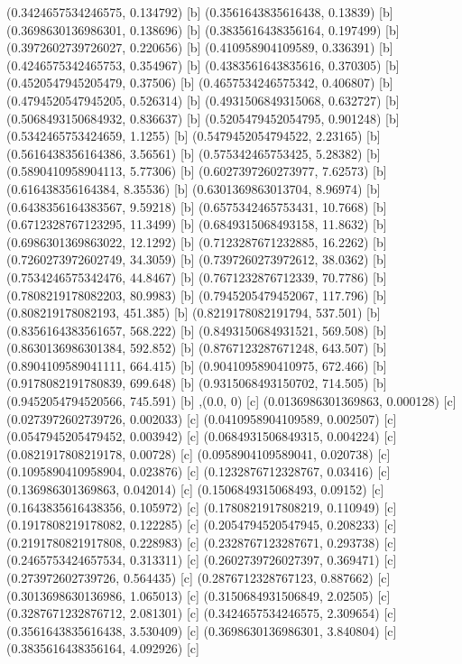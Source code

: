 {{{(0.3424657534246575, 0.134792) [b] 
(0.3561643835616438, 0.13839) [b] 
(0.3698630136986301, 0.138696) [b] 
(0.3835616438356164, 0.197499) [b] 
(0.3972602739726027, 0.220656) [b] 
(0.410958904109589, 0.336391) [b] 
(0.4246575342465753, 0.354967) [b] 
(0.4383561643835616, 0.370305) [b] 
(0.4520547945205479, 0.37506) [b] 
(0.4657534246575342, 0.406807) [b] 
(0.4794520547945205, 0.526314) [b] 
(0.4931506849315068, 0.632727) [b] 
(0.5068493150684932, 0.836637) [b] 
(0.5205479452054795, 0.901248) [b] 
(0.5342465753424659, 1.1255) [b] 
(0.5479452054794522, 2.23165) [b] 
(0.5616438356164386, 3.56561) [b] 
(0.575342465753425, 5.28382) [b] 
(0.5890410958904113, 5.77306) [b] 
(0.6027397260273977, 7.62573) [b] 
(0.616438356164384, 8.35536) [b] 
(0.6301369863013704, 8.96974) [b] 
(0.6438356164383567, 9.59218) [b] 
(0.6575342465753431, 10.7668) [b] 
(0.6712328767123295, 11.3499) [b] 
(0.6849315068493158, 11.8632) [b] 
(0.6986301369863022, 12.1292) [b] 
(0.7123287671232885, 16.2262) [b] 
(0.7260273972602749, 34.3059) [b] 
(0.7397260273972612, 38.0362) [b] 
(0.7534246575342476, 44.8467) [b] 
(0.7671232876712339, 70.7786) [b] 
(0.7808219178082203, 80.9983) [b] 
(0.7945205479452067, 117.796) [b] 
(0.808219178082193, 451.385) [b] 
(0.8219178082191794, 537.501) [b] 
(0.8356164383561657, 568.222) [b] 
(0.8493150684931521, 569.508) [b] 
(0.8630136986301384, 592.852) [b] 
(0.8767123287671248, 643.507) [b] 
(0.8904109589041111, 664.415) [b] 
(0.9041095890410975, 672.466) [b] 
(0.9178082191780839, 699.648) [b] 
(0.9315068493150702, 714.505) [b] 
(0.9452054794520566, 745.591) [b] 
},{(0.0, 0) [c] 
(0.0136986301369863, 0.000128) [c] 
(0.0273972602739726, 0.002033) [c] 
(0.0410958904109589, 0.002507) [c] 
(0.0547945205479452, 0.003942) [c] 
(0.0684931506849315, 0.004224) [c] 
(0.0821917808219178, 0.00728) [c] 
(0.0958904109589041, 0.020738) [c] 
(0.1095890410958904, 0.023876) [c] 
(0.1232876712328767, 0.03416) [c] 
(0.136986301369863, 0.042014) [c] 
(0.1506849315068493, 0.09152) [c] 
(0.1643835616438356, 0.105972) [c] 
(0.1780821917808219, 0.110949) [c] 
(0.1917808219178082, 0.122285) [c] 
(0.2054794520547945, 0.208233) [c] 
(0.2191780821917808, 0.228983) [c] 
(0.2328767123287671, 0.293738) [c] 
(0.2465753424657534, 0.313311) [c] 
(0.2602739726027397, 0.369471) [c] 
(0.273972602739726, 0.564435) [c] 
(0.2876712328767123, 0.887662) [c] 
(0.3013698630136986, 1.065013) [c] 
(0.3150684931506849, 2.02505) [c] 
(0.3287671232876712, 2.081301) [c] 
(0.3424657534246575, 2.309654) [c] 
(0.3561643835616438, 3.530409) [c] 
(0.3698630136986301, 3.840804) [c] 
(0.3835616438356164, 4.092926) [c] 
}}}
